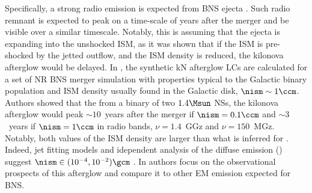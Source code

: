 Specifically, a strong radio emission is expected from \ac{BNS} ejecta \citep{Piran:2012wd,Hotokezaka:2015eja}. Such radio remnant is expected to peak on a time-scale 
of years after the merger and be visible over a similar timescale. Notably, this is assuming that the 
ejecta is expanding into the unshocked \ac{ISM}, as it was shown that if the \ac{ISM} is 
pre-shocked by the jetted outflow, and the \ac{ISM} density is reduced, the kilonova afterglow would 
be delayed. 
In \citet{Piran:2012wd}, the synthetic \ac{kN} afterglow \acp{LC} are calculated for a set of \ac{NR} \ac{BNS} merger simulation with properties typical to the Galactic binary population and \ac{ISM} density usually found in the Galactic disk, $\nism\sim1\ccm$. Authors showed that the from a binary of two $1.4\Msun$ \acp{NS}, the kilonova afterglow would peak $\sim10$~years after the merger if $\nism = 0.1\ccm$ and $\sim3$~years if $\nism = 1\ccm$ in radio bands, $\nu=1.4$~GGz and $\nu=150$~MGz. Notably, both values of the \ac{ISM} density are larger than what is inferred for \GW{}. Indeed, jet fitting models and idependent analysis of the diffuse emission () suggest $\nism\in(10^{-4},10^{-2})\gcm$ \citep{Hajela:2019mjy}.
In \citet{Piran:2012wd} authors focus on the observational prospects of this afterglow and compare it to other \ac{EM} emission expected for \ac{BNS}. 





